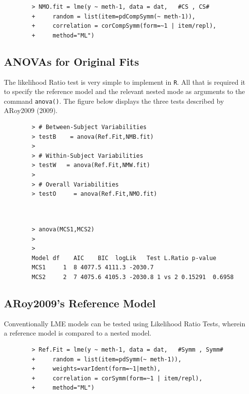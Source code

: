 \documentclass[12pt, a4paper]{report}
\theoremstyle{plain}
\theoremstyle{definition}
\theoremstyle{remark}
\begin{document}
	\begin{framed}
		\begin{verbatim}
		> NMO.fit = lme(y ~ meth-1, data = dat,   #CS , CS# 
		+     random = list(item=pdCompSymm(~ meth-1)), 
		+     correlation = corCompSymm(form=~1 | item/repl), 
		+     method="ML")
		\end{verbatim}
	\end{framed}
	
	\subsection{ANOVAs  for  Original Fits}
	The likelihood Ratio test is very simple to implement in \texttt{R}. All that is required it to specify the reference model and the relevant nested mode as arguments to the command \texttt{anova()}.
	The figure below displays the three tests described by ARoy2009 (2009).
	
	\begin{framed}
		\begin{verbatim}
		> # Between-Subject Variabilities
		> testB    = anova(Ref.Fit,NMB.fit) 
		>         
		> # Within-Subject Variabilities                
		> testW   = anova(Ref.Fit,NMW.fit) 
		>                       
		> # Overall Variabilities
		> testO     = anova(Ref.Fit,NMO.fit)                        
		
		
		\end{verbatim}
	\end{framed}
	
	
	
	
	
	
	
	\begin{framed}   
		\begin{verbatim}
		> anova(MCS1,MCS2)
		>
		>
		Model df    AIC    BIC  logLik   Test L.Ratio p-value
		MCS1     1  8 4077.5 4111.3 -2030.7
		MCS2     2  7 4075.6 4105.3 -2030.8 1 vs 2 0.15291  0.6958
		\end{verbatim}
	\end{framed}
	\subsection{ARoy2009's Reference Model}
	Conventionally LME models can be tested using Likelihood Ratio Tests, wherein a reference model is compared to a nested model.
	\begin{framed}
		\begin{verbatim}
		> Ref.Fit = lme(y ~ meth-1, data = dat,   #Symm , Symm#
		+     random = list(item=pdSymm(~ meth-1)), 
		+     weights=varIdent(form=~1|meth),
		+     correlation = corSymm(form=~1 | item/repl), 
		+     method="ML")
		\end{verbatim}
	\end{framed}
	
\end{document}
